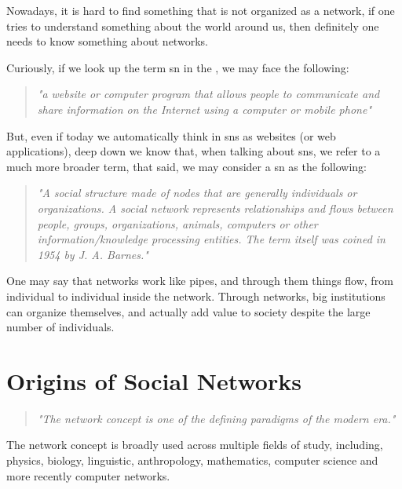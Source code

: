 
Nowadays, it is hard to find something that is not organized as a network, if one tries to understand something about the world around us, then definitely one needs to know something about networks.

Curiously, if we look up the term \gls{sn} in the \citep{dictionary2002cambridge}, we may face the following:

\begin{quote}
\textit{"a website or computer program that allows people to communicate and share information on the Internet using a computer or mobile phone"}
\end{quote}

But, even if today we automatically think in \glspl{sn} as websites (or web applications), deep down we know that, when talking about \glspl{sn}, we refer to a much more broader term, that said, we may consider a \gls{sn} as the following:

\begin{quote}
\textit{"A social structure made of nodes that are generally individuals or organizations. A social network represents relationships and flows between people, groups, organizations, animals, computers or other information/knowledge processing entities. The term itself was coined in 1954 by J. A. Barnes."}
\citep{webopediasn}
\end{quote}

One may say that networks work like pipes, and through them things flow, from individual to individual inside the network. Through networks, big institutions can organize themselves, and actually add value to society despite the large number of individuals.


\section{Origins of Social Networks}

\begin{quote}
\textit{"The network concept is one of the defining paradigms of the modern era."}
\citep{kilduff2003social}
\end{quote}

The network concept is broadly used across multiple fields of study, including, physics, biology, linguistic, anthropology, mathematics, computer science and more recently computer networks.\\

